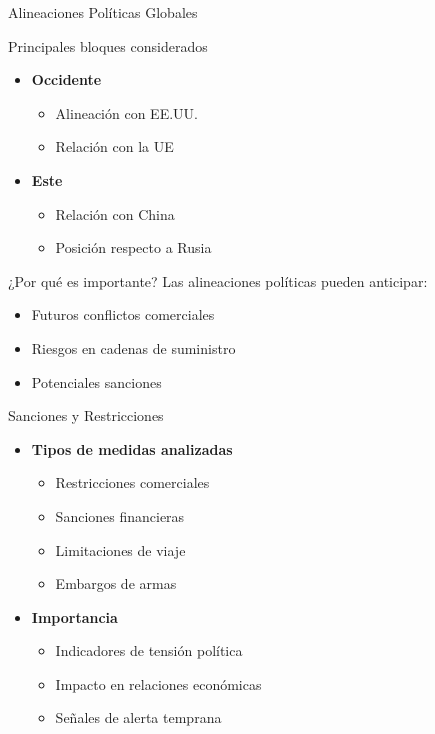 \documentclass{beamer}
\begin{document}
\begin{frame}{Alineaciones Políticas Globales}
    \begin{block}{Principales bloques considerados}
        \begin{itemize}
            \item \textbf{Occidente}
                \begin{itemize}
                    \item Alineación con EE.UU.
                    \item Relación con la UE
                \end{itemize}
            \item \textbf{Este}
                \begin{itemize}
                    \item Relación con China
                    \item Posición respecto a Rusia
                \end{itemize}
        \end{itemize}
    \end{block}
    
    \begin{alertblock}{¿Por qué es importante?}
        Las alineaciones políticas pueden anticipar:
        \begin{itemize}
            \item Futuros conflictos comerciales
            \item Riesgos en cadenas de suministro
            \item Potenciales sanciones
        \end{itemize}
    \end{alertblock}
\end{frame}

\begin{frame}{Sanciones y Restricciones}
    \begin{itemize}
        \item \textbf{Tipos de medidas analizadas}
            \begin{itemize}
                \item Restricciones comerciales
                \item Sanciones financieras
                \item Limitaciones de viaje
                \item Embargos de armas
            \end{itemize}
        \item \textbf{Importancia}
            \begin{itemize}
                \item Indicadores de tensión política
                \item Impacto en relaciones económicas
                \item Señales de alerta temprana
            \end{itemize}
    \end{itemize}
\end{frame}
\end{document}
